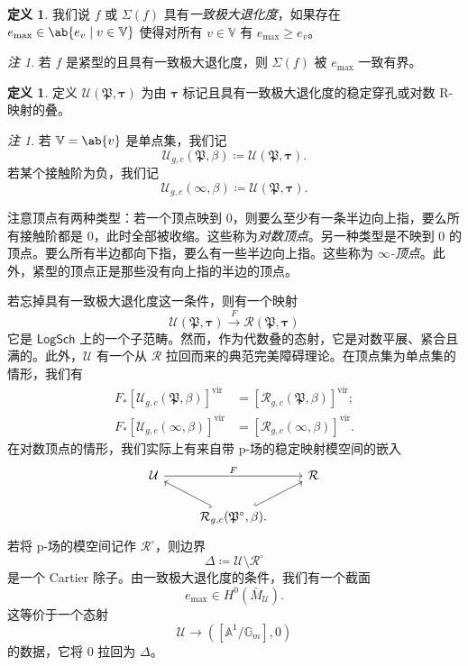 \documentclass{amsart}
\theoremstyle{definition}
\newtheorem{defn}[thm]{定义}
\theoremstyle{remark}
\newtheorem{rmk}[thm]{注}
\theoremstyle{plain}
\theoremstyle{definition}
\theoremstyle{remark}
\newcommand{\A}{\mathbb{A}}
\newcommand{\G}{\mathbb{G}}
\newcommand{\V}{\mathbb{V}}
\newcommand{\mc}[1]{\mathcal{#1}}
\newcommand{\mf}[1]{\mathfrak{#1}}
\newcommand{\mr}[1]{\mathrm{#1}}
\newcommand{\ms}[1]{\mathsf{#1}}
\newcommand{\1}{\mathbf{1}}
\newcommand{\2}{\mathbf{2}}
\newcommand{\3}{\mathbf{3}}
\newcommand{\vir}{\mr{vir}}
\begin{document}
\begin{defn}
    我们说 \(f\) 或 \(\Sigma(f)\) 具有\textit{一致极大退化度}，如果存在 \(e_{\max} \in \ab\{e_v \mid v \in \V \}\) 使得对所有 \(v \in \V\) 有 \(e_{\max} \geq e_v\)。
\end{defn}

\begin{rmk}
    若 \(f\) 是紧型的且具有一致极大退化度，则 \(\Sigma(f)\) 被 \(e_{\max}\) 一致有界。
\end{rmk}

\begin{defn}
    定义 \(\mc{U}(\mf{P}, \bm{\tau})\) 为由 \(\bm{\tau}\) 标记且具有一致极大退化度的稳定穿孔或对数 R-映射的叠。
\end{defn}

\begin{rmk}
    若 \(\V = \ab\{v\}\) 是单点集，我们记
    \[ \mc{U}_{g, c}(\mf{P}, \beta) \coloneqq \mc{U}(\mf{P}, \bm{\tau}). \]
    若某个接触阶为负，我们记
    \[ \mc{U}_{g, c}(\infty, \beta) \coloneqq \mc{U}(\mf{P}, \bm{\tau}). \]
\end{rmk}

注意顶点有两种类型：若一个顶点映到 \(0\)，则要么至少有一条半边向上指，要么所有接触阶都是 \(0\)，此时全部被收缩。这些称为\textit{对数顶点}。另一种类型是不映到 \(0\) 的顶点。要么所有半边都向下指，要么有一些半边向上指。这些称为 \textit{\(\infty\)-顶点}。此外，紧型的顶点正是那些没有向上指的半边的顶点。

若忘掉具有一致极大退化度这一条件，则有一个映射
\[ \mc{U}(\mf{P}, \bm{\tau}) \xrightarrow{F} \mc{R}(\mf{P}, \bm{\tau}) \]
它是 \(\ms{LogSch}\) 上的一个子范畴。然而，作为代数叠的态射，它是对数平展、紧合且满的。此外，\(\mc{U}\) 有一个从 \(\mc{R}\) 拉回而来的典范完美障碍理论。在顶点集为单点集的情形，我们有
\begin{align*}
    F_* [\mc{U}_{g, c}(\mf{P}, \beta)]^{\vir} &= [\mc{R}_{g, c}(\mf{P}, \beta)]^{\vir}; \\
    F_* [\mc{U}_{g, c}(\infty, \beta)]^{\vir} &= [\mc{R}_{g, c}(\infty, \beta)]^{\vir}.
\end{align*}
在对数顶点的情形，我们实际上有来自带 p-场的稳定映射模空间的嵌入
\begin{equation*}
\begin{tikzcd}
    \mc{U} \ar{rr}{F} & & \mc{R} \\
    & \mc{R}_{g,c}(\mf{P}^{\circ}, \beta) \ar[hookrightarrow]{ul} \ar[hookrightarrow]{ur}.
\end{tikzcd}
\end{equation*}
若将 p-场的模空间记作 \(\mc{R}^{\circ}\)，则边界
\[ \Delta \coloneqq \mc{U} \setminus \mc{R}^{\circ} \]
是一个 Cartier 除子。由一致极大退化度的条件，我们有一个截面
\[ e_{\max} \in H^0(\bar{M}_{\mc{U}}). \]
这等价于一个态射
\[ \mc{U} \to ([\A^1/\G_m], 0) \]
的数据，它将 \(0\) 拉回为 \(\Delta\)。
\end{document}
